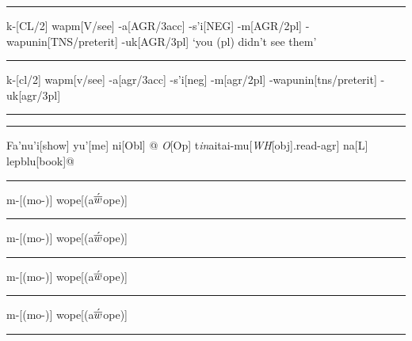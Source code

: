 \filbreak\hrule\medskip

\begingroup
\ex[glstyle=nlevel]
\begingl
k-[CL/2] wapm[V/see] -a[AGR/\sc 3acc] -s'i[NEG]
-m[AGR/\sc 2pl] -wapunin[TNS/preterit] -uk[AGR/\sc 3pl]
\glft `you (pl) didn't see them'
\endgl
\xe
\endgroup
\bigskip

\filbreak\hrule\medskip

\begingroup
\ex[glstyle=nlevel,glneveryline={\it,\sc,\sc},
   glnabovelineskip={,-2pt}]
\begingl
k-[cl/2]
wapm[v/\rm see]
-a[agr/3acc]
-s'i[neg]
-m[agr/\sc 2pl]
-wapunin[tns/preterit]
-uk[agr/3pl]
\endgl
\xe
\endgroup
\bigskip

\filbreak\hrule\medskip

\begingroup
\endgroup
\bigskip

\filbreak\hrule\medskip

\begingroup
\ex
\begingl[glstyle=nlevel,glneveryline={}]
Fa'nu'i[show]
yu'[me] ni[Obl]
\nogloss{[[\thinspace}@ {\it O}[Op]
t{\it in\/}aitai-mu[{\it WH\/}{[obj]}.read-agr]
\nogloss{{\it t}\thinspace ]}
na[L]
lepblu[book]@ \nogloss{].}
\endgl
\xe
\endgroup
\bigskip

\filbreak\hrule\medskip

\begingroup
\ex[glstyle=nlevel,glneveryline={\it}]
\gdef{}%
\begingl m-[(mo-)] wope[(a\AccentedBarredW ope)] \endgl \xe
\endgroup
\bigskip

\filbreak\hrule\medskip

\begingroup
\ex[glstyle=nlevel,glneveryline={\it},glnabovelineskip={,.5ex}]
\begingl m-[(mo-)] wope[(a\AccentedBarredW ope)] \endgl \xe
\endgroup
\bigskip

\filbreak\hrule\medskip

\begingroup
\ex[glstyle=nlevel,glneveryline={\it,\vrule height14pt width0pt}]
\begingl m-[(mo-)] wope[(a\AccentedBarredW ope)] \endgl \xe
\endgroup
\bigskip

\filbreak\hrule\medskip

\begingroup
\ex[glstyle=nlevel,glneveryline={\it},everyglword={\baselineskip=18pt}]
\begingl m-[(mo-)] wope[(a\AccentedBarredW ope)] \endgl
\xe
\endgroup
\bigskip

\filbreak\hrule\medskip

\begingroup
\endgroup
\bigskip

